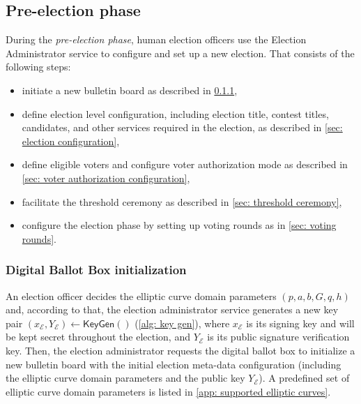 \clearpage
\subsection{Pre-election phase} \label{sec: pre-election phase}
During the \textit{pre-election phase}, human election officers use the Election Administrator service to configure and set up a new election. That consists of the following steps:
\begin{itemize}
    \item initiate a new bulletin board as described in \cref{sec: digital ballot box initialization},
    \item define election level configuration, including election title, contest titles, candidates, and other services required in the election, as described in \cref{sec: election configuration},
    \item define eligible voters and configure voter authorization mode as described in \cref{sec: voter authorization configuration},
    \item facilitate the threshold ceremony as described in \cref{sec: threshold ceremony},
    \item configure the election phase by setting up voting rounds as in \cref{sec: voting rounds}.
\end{itemize}


\subsubsection{Digital Ballot Box initialization} \label{sec: digital ballot box initialization}
An election officer decides the elliptic curve domain parameters $(p, a, b, G, q, h)$ and, according to that, the election administrator service generates a new key pair $(x_\mathcal{E}, Y_\mathcal{E}) \gets \mathsf{KeyGen}()$ (\cref{alg: key gen}), where $x_\mathcal{E}$ is its signing key and will be kept secret throughout the election, and $Y_\mathcal{E}$ is its public signature verification key. Then, the election administrator requests the digital ballot box to initialize a new bulletin board with the initial election meta-data configuration (including the elliptic curve domain parameters and the public key $Y_\mathcal{E}$). A predefined set of elliptic curve domain parameters is listed in \cref{app: supported elliptic curves}.

